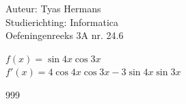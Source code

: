 \documentclass[a4paper]{article}
\begin{document}
  
\noindent \large Auteur: Tyas Hermans \\
\noindent \large Studierichting: Informatica\\
\noindent \large Oefeningenreeks 3A nr. 24.6\\

\medskip

\normalsize

$f(x) = \sin4x\cos3x$\\

$f'(x) = 4\cos4x\cos3x-3\sin4x\sin3x$\\




\begin{thebibliography}{999}
\end{thebibliography}
\end{document}
